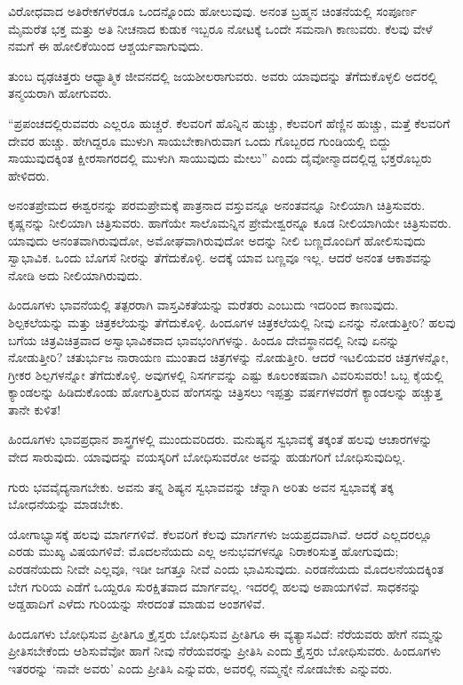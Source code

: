 ವಿರೋಧವಾದ ಅತಿರೇಕಗಳೆರಡೂ ಒಂದನ್ನೊಂದು ಹೋಲುವುವು. ಅನಂತ ಬ್ರಹ್ಮನ ಚಿಂತನೆಯಲ್ಲಿ ಸಂಪೂರ್ಣ ಮೈಮರೆತ ಭಕ್ತ ಮತ್ತು ಅತಿ ನೀಚನಾದ ಕುಡುಕ ಇಬ್ಬರೂ ನೋಟಕ್ಕೆ ಒಂದೇ ಸಮನಾಗಿ ಕಾಣುವರು. ಕೆಲವು ವೇಳೆ ನಮಗೆ ಈ ಹೋಲಿಕೆಯಿಂದ ಆಶ್ಚರ್ಯವಾಗುವುದು.

ತುಂಬ ದೃಢಚಿತ್ತರು ಆಧ್ಯಾತ್ಮಿಕ ಜೀವನದಲ್ಲಿ ಜಯಶೀಲರಾಗುವರು. ಅವರು ಯಾವುದನ್ನು ತೆಗೆದುಕೊಳ್ಳಲಿ ಅದರಲ್ಲಿ ತನ್ಮಯರಾಗಿ ಹೋಗುವರು.

“ಪ್ರಪಂಚದಲ್ಲಿರುವವರು ಎಲ್ಲರೂ ಹುಚ್ಚರೆ. ಕೆಲವರಿಗೆ ಹೊನ್ನಿನ ಹುಚ್ಚು, ಕೆಲವರಿಗೆ ಹೆಣ್ಣಿನ ಹುಚ್ಚು, ಮತ್ತೆ ಕೆಲವರಿಗೆ ದೇವರ ಹುಚ್ಚು. ಹೇಗಿದ್ದರೂ ಮುಳುಗಿ ಸಾಯಬೇಕಾಗಿರುವಾಗ ಒಂದು ಗೊಬ್ಬರದ ಗುಂಡಿಯಲ್ಲಿ ಬಿದ್ದು ಸಾಯುವುದಕ್ಕಿಂತ ಕ್ಷೀರಸಾಗರದಲ್ಲಿ ಮುಳುಗಿ ಸಾಯುವುದು ಮೇಲು” ಎಂದು ದೈವೋನ್ಮಾದದಲ್ಲಿದ್ದ ಭಕ್ತರೊಬ್ಬರು ಹೇಳಿದರು.

ಅನಂತಪ್ರೇಮದ ಈಶ್ವರನನ್ನು ಪರಮಪ್ರೇಮಕ್ಕೆ ಪಾತ್ರನಾದ ವಸ್ತುವನ್ನೂ ಅನಂತವನ್ನೂ ನೀಲಿಯಾಗಿ ಚಿತ್ರಿಸುವರು. ಕೃಷ್ಣನನ್ನು ನೀಲಿಯಾಗಿ ಚಿತ್ರಿಸುವರು. ಹಾಗೆಯೇ ಸಾಲೊಮನ್ನಿನ ಪ್ರೇಮೇಶ್ವರನ್ನೂ ಕೂಡ ನೀಲಿಯಾಗಿಯೇ ಚಿತ್ರಿಸುವರು. ಯಾವುದು ಅನಂತವಾಗಿರುವುದೋ, ಅಮೋಘವಾಗಿರುವುದೋ ಅದನ್ನು ನೀಲಿ ಬಣ್ಣದೊಂದಿಗೆ ಹೋಲಿಸುವುದು ಸ್ವಾಭಾವಿಕ. ಒಂದು ಬೊಗಸೆ ನೀರನ್ನು ತೆಗೆದುಕೊಳ್ಳಿ. ಅದಕ್ಕೆ ಯಾವ ಬಣ್ಣವೂ ಇಲ್ಲ. ಆದರೆ ಅನಂತ ಆಕಾಶವನ್ನು ನೋಡಿ ಅದು ನೀಲಿಯಾಗಿರುವುದು.

ಹಿಂದೂಗಳು ಭಾವನೆಯಲ್ಲಿ ತತ್ಪರರಾಗಿ ವಾಸ್ತವಿಕತೆಯನ್ನು ಮರೆತರು ಎಂಬುದು ಇದರಿಂದ ಕಾಣುವುದು. ಶಿಲ್ಪಕಲೆಯನ್ನು ಮತ್ತು ಚಿತ್ರಕಲೆಯನ್ನು ತೆಗೆದುಕೊಳ್ಳಿ. ಹಿಂದೂಗಳ ಚಿತ್ರಕಲೆಯಲ್ಲಿ ನೀವು ಏನನ್ನು ನೋಡುತ್ತೀರಿ? ಹಲವು ಬಗೆಯ ಚಿತ್ರವಿಚಿತ್ರವಾದ ಅಸ್ವಾಭಾವಿಕವಾದ ಭಾವಭಂಗಿಗಳನ್ನು. ಹಿಂದೂ ದೇವಸ್ಥಾನದಲ್ಲಿ ನೀವು ಏನನ್ನು ನೋಡುತ್ತೀರಿ? ಚತುರ್ಭುಜ ನಾರಾಯಣ ಮುಂತಾದ ಚಿತ್ರಗಳನ್ನು ನೋಡುತ್ತೀರಿ. ಆದರೆ ಇಟಲಿಯವರ ಚಿತ್ರಗಳನ್ನೋ, ಗ್ರೀಕರ ಶಿಲ್ಪಗಳನ್ನೋ ತೆಗೆದುಕೊಳ್ಳಿ. ಅವುಗಳಲ್ಲಿ ನಿಸರ್ಗವನ್ನು ಎಷ್ಟು ಕೂಲಂಕಷವಾಗಿ ವಿವರಿಸುವರು! ಒಬ್ಬ ಕೈಯಲ್ಲಿ ಕ್ಯಾಂಡಲನ್ನು ಹಿಡಿದುಕೊಂಡು ಹೋಗುತ್ತಿರುವ ಹೆಂಗಸನ್ನು ಚಿತ್ರಿಸಲು ಇಪ್ಪತ್ತು ವರ್ಷಗಳವರೆಗೆ ಕ್ಯಾಂಡಲನ್ನು ಹಚ್ಚುತ್ತ ತಾನೇ ಕುಳಿತ!

ಹಿಂದೂಗಳು ಭಾವಪ್ರಧಾನ ಶಾಸ್ತ್ರಗಳಲ್ಲಿ ಮುಂದುವರಿದರು. ಮನುಷ್ಯನ ಸ್ವಭಾವಕ್ಕೆ ತಕ್ಕಂತೆ ಹಲವು ಆಚಾರಗಳನ್ನು ವೇದ ಸಾರುವುದು. ಯಾವುದನ್ನು ವಯಸ್ಕರಿಗೆ ಬೋಧಿಸುವರೋ ಅವನ್ನು ಹುಡುಗರಿಗೆ ಬೋಧಿಸುವುದಿಲ್ಲ.

ಗುರು ಭವವೈದ್ಯನಾಗಬೇಕು. ಅವನು ತನ್ನ ಶಿಷ್ಯನ ಸ್ವಭಾವವನ್ನು ಚೆನ್ನಾಗಿ ಅರಿತು ಅವನ ಸ್ವಭಾವಕ್ಕೆ ತಕ್ಕ ಬೋಧನೆಯನ್ನು ಮಾಡಬೇಕು.

ಯೋಗಾಭ್ಯಾಸಕ್ಕೆ ಹಲವು ಮಾರ್ಗಗಳಿವೆ. ಕೆಲವರಿಗೆ ಕೆಲವು ಮಾರ್ಗಗಳು ಜಯಪ್ರದವಾಗಿವೆ. ಆದರೆ ಎಲ್ಲದರಲ್ಲೂ ಎರಡು ಮುಖ್ಯ ವಿಷಯಗಳಿವೆ: ಮೊದಲನೆಯದು ಎಲ್ಲ ಅನುಭವಗಳನ್ನೂ ನಿರಾಕರಿಸುತ್ತ ಹೋಗುವುದು; ಎರಡನೆಯದು ನೀವೇ ಎಲ್ಲವೂ, ಇಡೀ ಜಗತ್ತೂ ನೀವೆ ಎಂದು ಭಾವಿಸುವುದು. ಎರಡನೆಯದು ಮೊದಲನೆಯದಕ್ಕಿಂತ ಬೇಗ ಗುರಿಯ ಎಡೆಗೆ ಒಯ್ದರೂ ಸುರಕ್ಷಿತವಾದ ಮಾರ್ಗವಲ್ಲ. ಇದರಲ್ಲಿ ಹಲವು ಅಪಾಯಗಳಿವೆ. ಸಾಧಕನನ್ನು ಅಡ್ಡಹಾದಿಗೆ ಎಳೆದು ಗುರಿಯನ್ನು ಸೇರದಂತೆ ಮಾಡುವ ಅಂಶಗಳಿವೆ.

ಹಿಂದೂಗಳು ಬೋಧಿಸುವ ಪ್ರೀತಿಗೂ ಕ್ರೈಸ್ತರು ಬೋಧಿಸುವ ಪ್ರೀತಿಗೂ ಈ ವ್ಯತ್ಯಾಸವಿದೆ: ನೆರೆಯವರು ಹೇಗೆ ನಮ್ಮನ್ನು ಪ್ರೀತಿಸಬೇಕೆಂದು ಆಶಿಸುವೆವೋ ಹಾಗೆ ನೀವು ನೆರೆಯವರನ್ನು ಪ್ರೀತಿಸಿ ಎಂದು ಕ್ರೈಸ್ತರು ಬೋಧಿಸುವರು. ಹಿಂದೂಗಳು ಇತರರನ್ನು ‘ನಾವೇ ಅವರು’ ಎಂದು ಪ್ರೀತಿಸಿ ಎನ್ನುವರು, ಅವರಲ್ಲಿ ನಮ್ಮನ್ನೇ ನೋಡಬೇಕು ಎನ್ನುವರು.

